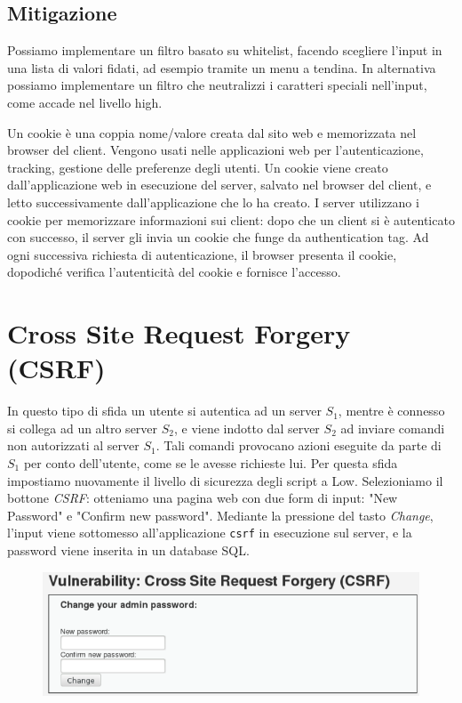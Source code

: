 \subsection{Mitigazione}
Possiamo implementare un filtro basato su whitelist, facendo scegliere l'input in una lista di valori fidati, ad esempio tramite un menu a tendina. In alternativa possiamo implementare un filtro che neutralizzi i caratteri speciali nell'input, come accade nel livello high. 

Un cookie è una coppia nome/valore creata dal sito web e memorizzata nel browser del client. Vengono usati nelle applicazioni web per l'autenticazione, tracking, gestione delle preferenze degli utenti. Un cookie viene creato dall'applicazione web in esecuzione del server, salvato nel browser del client, e letto successivamente dall'applicazione che lo ha creato. I server utilizzano i cookie per memorizzare informazioni sui client: dopo che un client si è autenticato con successo, il server gli invia un cookie che funge da authentication tag. Ad ogni successiva richiesta di autenticazione, il browser presenta il cookie, dopodiché verifica l'autenticità del cookie e fornisce l'accesso. 

\section{Cross Site Request Forgery (CSRF)}
In questo tipo di sfida un utente si autentica ad un server \(S_1\), mentre è connesso si collega ad un altro server \(S_2\), e viene indotto dal server \(S_2\) ad inviare comandi non autorizzati al server \(S_1\). Tali comandi provocano azioni eseguite da parte di \(S_1\) per conto dell'utente, come se le avesse richieste lui. Per questa sfida impostiamo nuovamente il livello di sicurezza degli script a Low. Selezioniamo il bottone \textit{CSRF}: otteniamo una pagina web con due form di input: "New Password" e "Confirm new password". Mediante la pressione del tasto \textit{Change}, l'input viene sottomesso all'applicazione \texttt{csrf} in esecuzione sul server, e la password viene inserita in un database SQL.

\begin{figure}[hbpt!]
    \centering
    \includegraphics[width= 0.7 \textwidth]{./Images/cap6/6.11.png}
\end{figure}
\FloatBarrier

